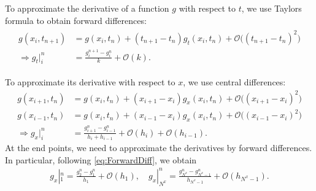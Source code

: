 \documentclass[11pt]{article}
\begin{document}
To approximate the derivative of a function $g$ with respect to $t$, we use Taylors formula to obtain forward differences:
\begin{align}
    \label{eq:ForwardDiff}
    \begin{aligned}
	    g(x_i, t_{n+1})       & = g(x_i, t_n) +  (t_{n+1}-t_n)g_t(x_i, t_n) + \mathcal{O}\big((t_{n+1}-t_n)^2\big) \\
	    \Rightarrow g_t|_i^n & = \frac{g_i^{n+1}-g_i^n}{k} + \mathcal{O}(k).
	\end{aligned}
\end{align}

To approximate its derivative with respect to $x$, we use central differences:
\begin{align*}
    g(x_{i+1}, t_n)       & = g(x_i, t_n) +  (x_{i+1}-x_i)g_x(x_i, t_n) + \mathcal{O}\big((x_{i+1}-x_i)^2\big) \\
    g(x_{i-1}, t_n)       & = g(x_i, t_n) +  (x_{i-1}-x_i)g_x(x_i, t_n) + \mathcal{O}\big((x_{i-1}-x_i)^2\big) \\    
    \Rightarrow g_x|_i^n & = \frac{g_{i+1}^n-g_{i-1}^n}{h_i + h_{i-1}} + \mathcal{O}(h_i) + \mathcal{O}(h_{i-1}).
\end{align*}
At the end points, we need to approximate the derivatives by forward differences. In particular, following \eqref{eq:ForwardDiff}, 
we obtain
\begin{align*}
    g_x|_1^n = \frac{g_2^n -g_1^n}{h_1} + \mathcal{O}(h_1), \quad g_x|_{N^x}^n = \frac{g_{N^x}^n -g_{N^x-1}^n}{h_{N^x-1}} + \mathcal{O}(h_{N^x-1}).
\end{align*}
\end{document}
